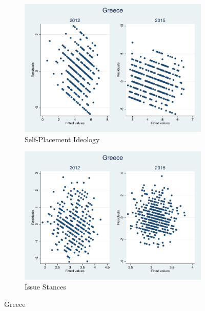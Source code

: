 \documentclass[12pt, titlepage]{article}
\begin{document}
\begin{figure}[H]
	\centering
	\begin{subfigure}[b]{0.475\textwidth}   
		\centering 
		\includegraphics[width=\textwidth]{Residuals/CountryIdeo/Greece}
		\caption{Self-Placement Ideology}
	\end{subfigure}
	\hfill
	\begin{subfigure}[b]{0.475\textwidth}
		\centering 
		\includegraphics[width=\textwidth]{Residuals/CountryLib/Greece}
		\caption{Issue Stances}
	\end{subfigure}
	\caption{Greece}
	\label{Greece}
\end{figure}
\end{document}
